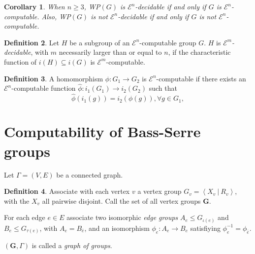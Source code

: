 \documentclass[a4paper]{article}
\newcommand{\grz}[1]{$\mathcal{E}^{#1}$}	%
\newcommand{\ZZ}{\mathbb{Z}}
\newcommand{\present}[2]{\left \langle #1 \: | \: #2 \right \rangle}	%
\theoremstyle{plain}
\newtheorem{theorem}{Theorem}[section]
\newtheorem{corollary}[theorem]{Corollary}
\theoremstyle{definition}
\newtheorem{definition}[theorem]{Definition}
\begin{document}
\begin{corollary} \label{wp-iff-group}
	When $n \geq 3$, WP$(G)$ is \grz{n}-decidable if and only if $G$ is \grz{n}-computable. Also, WP$(G)$ is not \grz{n}-decidable if and only if $G$ is not \grz{n}-computable.
\end{corollary}

\begin{definition}
	Let $H$ be a subgroup of an \grz{n}-computable group $G$. $H$ is {\it \grz{m}-decidable}, with $m$ necessarily larger than or equal to $n$, if the characteristic function of $i(H) \subseteq i(G)$ is \grz{m}-computable.
\end{definition}

\begin{definition}
	A homomorphism $\phi: G_1 \rightarrow G_2$ is \grz{n}-computable if there exists an \grz{n}-computable function $\hat{\phi}: i_1(G_1) \rightarrow i_2(G_2)$ such that
\[	\hat{\phi}(i_1(g)) = i_2(\phi(g)), \forall g \in G_1, \]
\end{definition}

\begin{comment}
		\begin{definition} \cite[3.3]{Cannonito_1973}
			A group $G$ is ``standard'' relative to an index $(i,m,j)$ if $i$ is defined by minimalization from a presentation $1 \rightarrow K \rightarrow F \rightarrow G \rightarrow 1$ for $F$ free on at most countably many generators, $n \geq 3$, and $A \subset \ZZ_{\geq 0}$.
		\end{definition}

		\begin{theorem} \cite[3.4]{Cannonito_1973}
			If $G$ is finitely generated and \grz{n}$(A)$ for $n \geq 3$ then any standard index of $G$ is \grz{n}$(A)$.
		\end{theorem}
\end{comment}

\section{Computability of Bass-Serre groups \label{bass-serre}}

Let $\Gamma = (V,E)$ be a connected graph. 

\begin{definition}
Associate with each vertex $v$ a vertex group $G_v = \present{X_v}{R_v}$, with the $X_v$ all pairwise disjoint. Call the set of all vertex groups $\mathbf{G}$. 

For each edge $e \in E$ associate two isomorphic {\it edge groups} $A_e \leq G_{\iota(e)}$ and $B_e \leq G_{\tau(e)}$, with $A_e = B_{\bar{e}}$, and an isomorphism $\phi_e : A_e \rightarrow B_e$ satisfiying $\phi_e^{-1} = \phi_{\bar{e}}$.

$(\mathbf{G},\Gamma)$ is called a {\it graph of groups}.
\end{definition}
\end{document}
